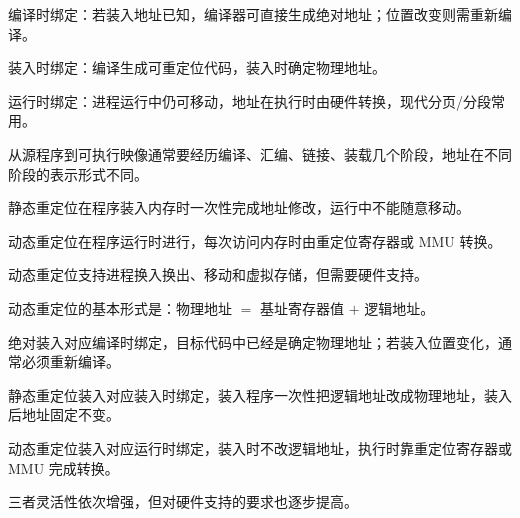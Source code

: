 \begin{points}
  \item 编译时绑定：若装入地址已知，编译器可直接生成绝对地址；位置改变则需重新编译。
  \item 装入时绑定：编译生成可重定位代码，装入时确定物理地址。
  \item 运行时绑定：进程运行中仍可移动，地址在执行时由硬件转换，现代分页/分段常用。
  \item 从源程序到可执行映像通常要经历编译、汇编、链接、装载几个阶段，地址在不同阶段的表示形式不同。
\end{points}


\begin{points}
  \item 静态重定位在程序装入内存时一次性完成地址修改，运行中不能随意移动。
  \item 动态重定位在程序运行时进行，每次访问内存时由重定位寄存器或 MMU 转换。
  \item 动态重定位支持进程换入换出、移动和虚拟存储，但需要硬件支持。
  \item 动态重定位的基本形式是：物理地址 $=$ 基址寄存器值 $+$ 逻辑地址。
\end{points}


\begin{points}
  \item 绝对装入对应编译时绑定，目标代码中已经是确定物理地址；若装入位置变化，通常必须重新编译。
  \item 静态重定位装入对应装入时绑定，装入程序一次性把逻辑地址改成物理地址，装入后地址固定不变。
  \item 动态重定位装入对应运行时绑定，装入时不改逻辑地址，执行时靠重定位寄存器或 MMU 完成转换。
  \item 三者灵活性依次增强，但对硬件支持的要求也逐步提高。
\end{points}


